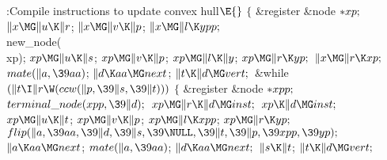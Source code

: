 \Y\B\4:Compile instructions to update convex hull\X${}\E{}$\6
${}\{{}$\5
\1\&{register} \&{node} ${}{*}\\{xp};{}$\7
${}\|x\MG\|u\K\|r{}$;\5
${}\|x\MG\|v\K\|p{}$;\5
${}\|x\MG\|l\K\\{ypp};{}$\6
\\{new\_node}(\\{xp});\6
${}\\{xp}\MG\|u\K\|s{}$;\5
${}\\{xp}\MG\|v\K\|p{}$;\5
${}\\{xp}\MG\|l\K\|y{}$;\5
${}\\{xp}\MG\|r\K\\{yp};{}$\6
${}\|x\MG\|r\K\\{xp};{}$\6
${}\\{mate}(\|a,\39\\{aa}){}$;\5
${}\|d\K\\{aa}\MG\\{next}{}$;\5
${}\|t\K\|d\MG\\{vert};{}$\6
\&{while} ${}(\|t\I\|r\W(\\{ccw}(\|p,\39\|s,\39\|t))){}$\5
${}\{{}$\5
\1\&{register} \&{node} ${}{*}\\{xpp};{}$\7
${}\\{terminal\_node}(\\{xpp},\39\|d);{}$\6
${}\\{xp}\MG\|r\K\|d\MG\\{inst};{}$\6
${}\\{xp}\K\|d\MG\\{inst};{}$\6
${}\\{xp}\MG\|u\K\|t{}$;\5
${}\\{xp}\MG\|v\K\|p{}$;\5
${}\\{xp}\MG\|l\K\\{xpp}{}$;\5
${}\\{xp}\MG\|r\K\\{yp};{}$\6
${}\\{flip}(\|a,\39\\{aa},\39\|d,\39\|s,\39\NULL,\39\|t,\39\|p,\39\\{xpp},\39%
\\{yp});{}$\6
${}\|a\K\\{aa}\MG\\{next}{}$;\5
${}\\{mate}(\|a,\39\\{aa}){}$;\5
${}\|d\K\\{aa}\MG\\{next};{}$\6
${}\|s\K\|t{}$;\5
${}\|t\K\|d\MG\\{vert};{}$\6
